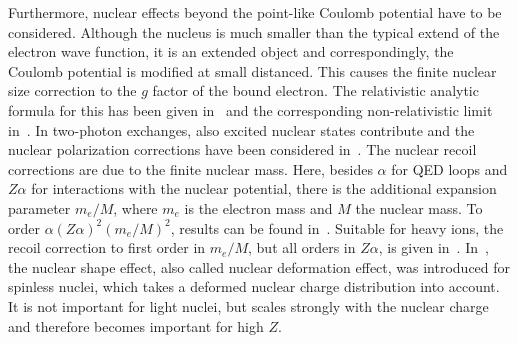 Furthermore, nuclear effects beyond the point-like Coulomb potential have to be considered. Although the nucleus is much smaller than the typical extend of the electron wave function, it is an extended object and correspondingly, the Coulomb potential is modified at small distanced. This causes the finite nuclear size correction to the $g$ factor of the bound electron. The relativistic analytic formula for this has been given in~\cite{Glazov2002} and the corresponding non-relativistic limit in~\cite{karshenboim2000}. In two-photon exchanges, also excited nuclear states contribute and the nuclear polarization corrections have been considered in~\cite{Nefiodov,volotka2014}. The nuclear recoil corrections are due to the finite nuclear mass. Here, besides $\alpha$ for QED loops and $Z\alpha$ for interactions with the nuclear potential, there is the additional expansion parameter $m_e/M$, where $m_e$ is the electron mass and $M$ the nuclear mass. To order $\alpha(Z\alpha)^2(m_e/M)^2$, results can be found in~\cite{pachucki2010,eides2010}. Suitable for heavy ions, the recoil correction to first order in $m_e/M$, but all orders in $Z\alpha$, is given in~\cite{shabaev2001}. 
In~\cite{jacek2012}, the nuclear shape effect, also called nuclear deformation effect, was introduced for spinless nuclei, which takes a deformed nuclear charge distribution into account. It is not important for light nuclei, but scales strongly with the nuclear charge and therefore becomes important for high $Z$. 

